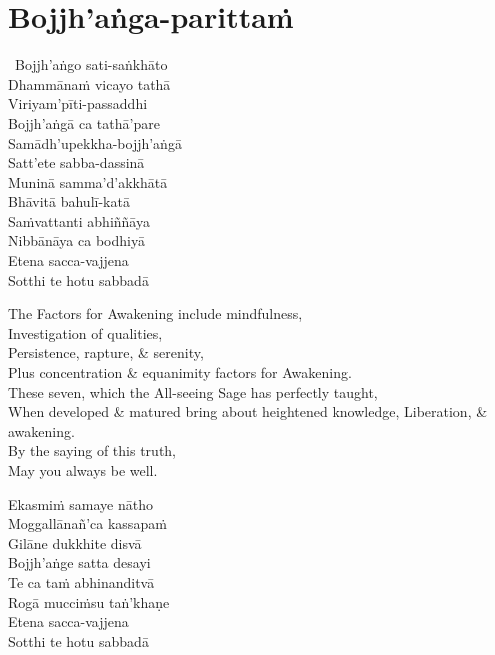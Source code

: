 \suttaRef{[MJG]}

\section{Bojjh'aṅga-parittaṁ}
\label{bojjhana-parittam}


\begin{pali-hangtogether}
  \anglebracketleft\ \hspace{-0.5mm}Bojjh'aṅgo sati-saṅkhāto \hspace{-0.5mm}\anglebracketright\ \\
  Dhammānaṁ vicayo tathā\\
  Viriyam'pīti-passaddhi\\
  Bojjh'aṅgā ca tathā'pare\\
  Samādh'upekkha-bojjh'aṅgā\\
  Satt'ete sabba-dassinā\\
  Muninā samma'd'akkhātā\\
  Bhāvitā bahulī-katā\\
  Saṁvattanti abhiññāya\\
  Nibbānāya ca bodhiyā\\
  Etena sacca-vajjena\\
  Sotthi te hotu sabbadā
\end{pali-hangtogether}

\begin{english-verses}
  The Factors for Awakening include mindfulness,\\
  Investigation of qualities,\\
  Persistence, rapture, \& serenity,\\
  Plus concentration \& equanimity factors for Awakening.\\
  These seven, which the All-seeing Sage has perfectly taught,\\
  When developed \& matured bring about heightened knowledge, Liberation, \& awakening.\\
  By the saying of this truth,\\
  May you always be well.
\end{english-verses}

\begin{pali-hang-continued}
  Ekasmiṁ samaye nātho\\
  Moggallānañ'ca kassapaṁ\\
  Gilāne dukkhite disvā\\
  Bojjh'aṅge satta desayi\\
  Te ca taṁ abhinanditvā\\
  Rogā mucciṁsu taṅ'khaṇe\\
  Etena sacca-vajjena\\
  Sotthi te hotu sabbadā
\end{pali-hang-continued}

